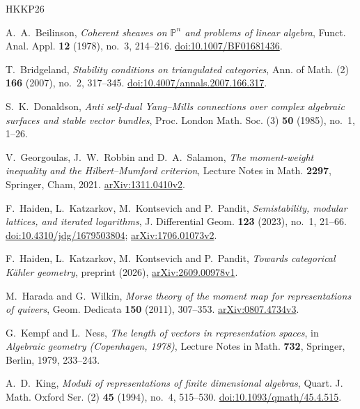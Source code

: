 \begin{thebibliography}{HKKP26}

A.~A.~Beilinson,
\textit{Coherent sheaves on $\mathbb P^n$ and problems of linear algebra},
Funct. Anal. Appl. \textbf{12} (1978), no.~3, 214--216.
\href{https://doi.org/10.1007/BF01681436}{doi:10.1007/BF01681436}.

T.~Bridgeland,
\textit{Stability conditions on triangulated categories},
Ann. of Math. (2) \textbf{166} (2007), no.~2, 317--345.
\href{https://doi.org/10.4007/annals.2007.166.317}{doi:10.4007/annals.2007.166.317}.

S.~K.~Donaldson,
\textit{Anti self-dual Yang--Mills connections over complex algebraic
surfaces and stable vector bundles},
Proc. London Math. Soc. (3) \textbf{50} (1985), no.~1, 1--26.

V.~Georgoulas, J.~W.~Robbin and D.~A.~Salamon,
\textit{The moment-weight inequality and the Hilbert--Mumford criterion},
Lecture Notes in Math. \textbf{2297}, Springer, Cham, 2021.
\href{https://arxiv.org/abs/1311.0410v2}{arXiv:1311.0410v2}.

F.~Haiden, L.~Katzarkov, M.~Kontsevich and P.~Pandit,
\textit{Semistability, modular lattices, and iterated logarithms},
J. Differential Geom. \textbf{123} (2023), no.~1, 21--66.
\href{https://doi.org/10.4310/jdg/1679503804}{doi:10.4310/jdg/1679503804};
\href{https://arxiv.org/abs/1706.01073v2}{arXiv:1706.01073v2}.

F.~Haiden, L.~Katzarkov, M.~Kontsevich and P.~Pandit,
\textit{Towards categorical K\"ahler geometry},
preprint (2026), \href{https://arxiv.org/abs/2609.00978v1}{arXiv:2609.00978v1}.

M.~Harada and G.~Wilkin,
\textit{Morse theory of the moment map for representations of quivers},
Geom. Dedicata \textbf{150} (2011), 307--353.
\href{https://arxiv.org/abs/0807.4734v3}{arXiv:0807.4734v3}.

G.~Kempf and L.~Ness,
\textit{The length of vectors in representation spaces},
in \textit{Algebraic geometry (Copenhagen, 1978)},
Lecture Notes in Math. \textbf{732}, Springer, Berlin, 1979, 233--243.

A.~D.~King,
\textit{Moduli of representations of finite dimensional algebras},
Quart. J. Math. Oxford Ser. (2) \textbf{45} (1994), no.~4, 515--530.
\href{https://doi.org/10.1093/qmath/45.4.515}{doi:10.1093/qmath/45.4.515}.


\end{thebibliography}
